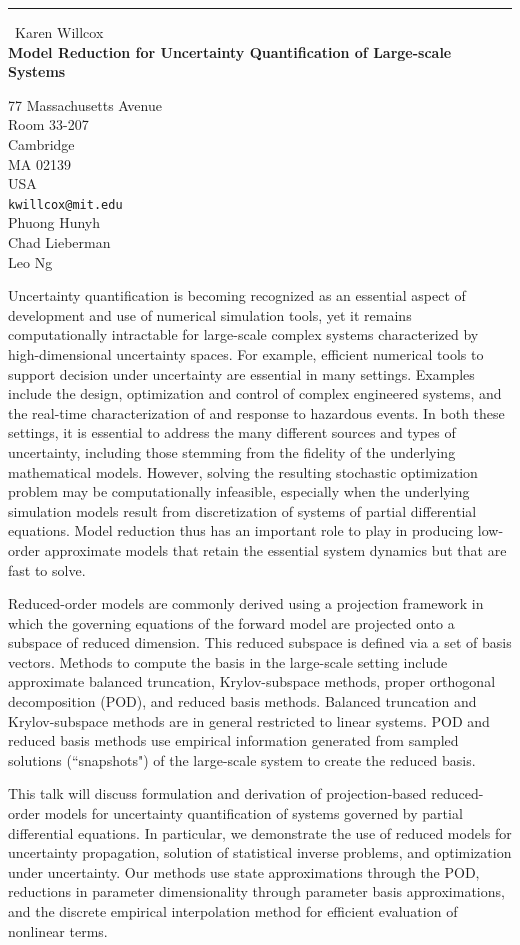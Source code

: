 \documentclass{report}
\begin{document}
\begin{center}
\rule{6in}{1pt} \
{\large Karen Willcox \\
{\bf Model Reduction for Uncertainty Quantification of Large-scale Systems}}

77 Massachusetts Avenue \\ Room 33-207 \\ Cambridge \\ MA 02139 \\ USA
\\
{\tt kwillcox@mit.edu}\\
Phuong Hunyh\\
Chad Lieberman\\
Leo Ng\end{center}

Uncertainty quantification is becoming recognized as an essential aspect
of development and use of numerical simulation tools, yet it remains
computationally intractable for large-scale complex systems characterized
by high-dimensional uncertainty spaces. For example, efficient numerical
tools to support decision under uncertainty are essential in many
settings. Examples include the design, optimization and control of
complex engineered systems, and the real-time characterization of and
response to hazardous events. In both these settings, it is essential to
address the many different sources and types of uncertainty, including
those stemming from the fidelity of the underlying mathematical models.
However, solving the resulting stochastic optimization problem may be
computationally infeasible, especially when the underlying simulation
models result from discretization of systems of partial differential
equations. Model reduction thus has an important role to play in
producing low-order approximate models that retain the essential system
dynamics but that are fast to solve.

Reduced-order models are commonly derived using a projection framework in
which the governing equations of the forward model are projected onto a
subspace of reduced dimension. This reduced
subspace is defined via a set of basis vectors. Methods to compute the
basis in the large-scale setting include approximate balanced truncation,
Krylov-subspace methods, proper orthogonal decomposition (POD), and
reduced basis methods. Balanced truncation and Krylov-subspace methods
are in general restricted to linear systems. POD and reduced basis
methods use empirical information generated from sampled solutions
(``snapshots") of the large-scale system to create the reduced basis.

This talk will discuss formulation and derivation of projection-based
reduced-order models for uncertainty quantification of systems governed
by partial differential equations. In particular, we demonstrate the use
of reduced models for uncertainty propagation, solution of statistical
inverse problems, and optimization under uncertainty. Our methods use
state approximations through the POD, reductions in parameter
dimensionality through parameter basis approximations, and the discrete
empirical interpolation method for efficient evaluation of nonlinear
terms.
\end{document}
